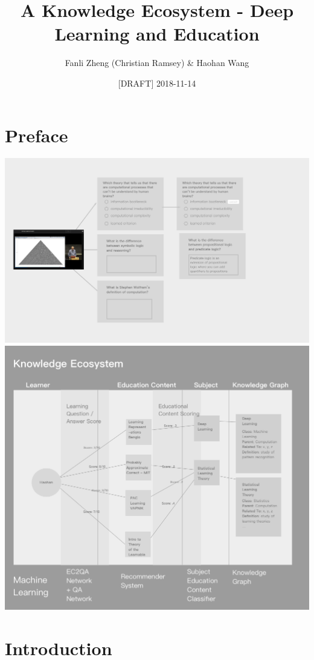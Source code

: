 \documentclass[]{book}
\title{A Knowledge Ecosystem - Deep Learning and Education}
\author{Fanli Zheng (Christian Ramsey) \& Haohan Wang}
\date{{[}DRAFT{]} 2018-11-14}
\theoremstyle{definition}
\theoremstyle{definition}
\theoremstyle{definition}
\theoremstyle{remark}
\begin{document}
\maketitle

{
\hypersetup{linkcolor=black}
\setcounter{tocdepth}{1}
\tableofcontents
}
\chapter*{Preface}\label{preface}

\includegraphics{img/MtoQA.png}
\includegraphics{img/knowledgeEcosystem.png}

\chapter{Introduction}\label{introduction}
\end{document}
